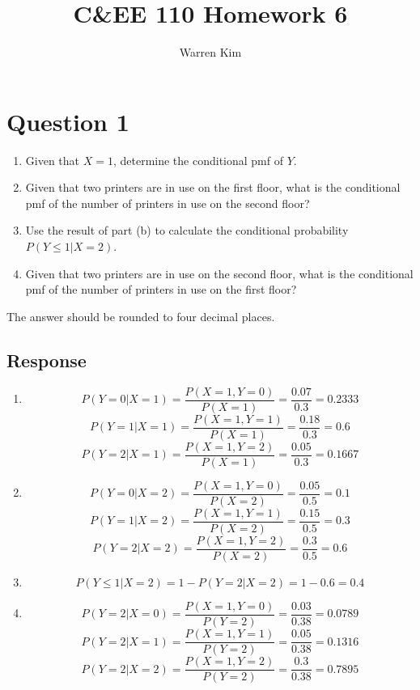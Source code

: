 \documentclass[13pt]{article}
\title{C\&EE 110 Homework 6}
\author{Warren Kim}
\begin{document}
\maketitle

\newpage
\section*{Question 1}
\begin{enumerate}[label=(\alph*)]
\item Given that $X = 1$, determine the conditional pmf of $Y$.
\item Given that two printers are in use on the first floor, what is
  the conditional pmf of the number of printers in use on the second
  floor?
\item Use the result of part (b) to calculate the conditional
  probability $P(Y \leq 1 | X = 2)$.
\item Given that two printers are in use on the second floor, what is
  the conditional pmf of the number of printers in use on the first
  floor?
\end{enumerate}
The answer should be rounded to four decimal places.

\subsection*{Response}
\begin{enumerate}[label=(\alph*)]
\item
  \[P(Y = 0 | X = 1) = \frac{P(X = 1, Y = 0)}{P(X = 1)} =
    \frac{0.07}{0.3} = \pmb{0.2333}\]
  \[P(Y = 1 | X = 1) = \frac{P(X = 1, Y = 1)}{P(X = 1)} =
    \frac{0.18}{0.3} = \pmb{0.6}\]
  \[P(Y = 2 | X = 1) = \frac{P(X = 1, Y = 2)}{P(X = 1)} =
    \frac{0.05}{0.3} = \pmb{0.1667}\]
  
\item
  \[P(Y = 0 | X = 2) = \frac{P(X = 1, Y = 0)}{P(X = 2)} =
    \frac{0.05}{0.5} = \pmb{0.1}\]
  \[P(Y = 1 | X = 2) = \frac{P(X = 1, Y = 1)}{P(X = 2)} =
    \frac{0.15}{0.5} = \pmb{0.3}\]
  \[P(Y = 2 | X = 2) = \frac{P(X = 1, Y = 2)}{P(X = 2)} =
    \frac{0.3}{0.5} = \pmb{0.6}\]

\item
  \[P(Y \leq 1 | X = 2) = 1 - P(Y = 2 | X = 2) = 1 - 0.6 = 0.4\]
  
\item
  \[P(Y = 2 | X = 0) = \frac{P(X = 1, Y = 0)}{P(Y = 2)} =
    \frac{0.03}{0.38} = \pmb{0.0789}\]
  \[P(Y = 2 | X = 1) = \frac{P(X = 1, Y = 1)}{P(Y = 2)} =
    \frac{0.05}{0.38} = \pmb{0.1316}\]
  \[P(Y = 2 | X = 2) = \frac{P(X = 1, Y = 2)}{P(Y = 2)} =
    \frac{0.3}{0.38} = \pmb{0.7895}\]
\end{enumerate}
\end{document}

